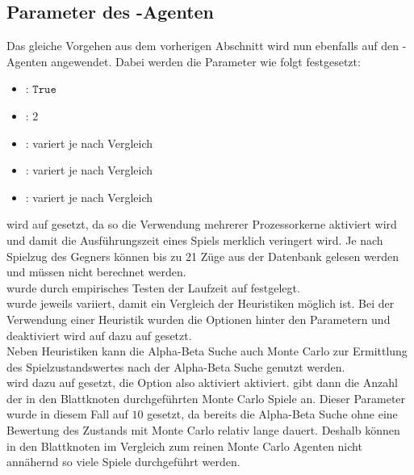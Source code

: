 \subsection{Parameter des -Agenten}
\label{eval:agents:params:subsec-ab}
Das gleiche Vorgehen aus dem vorherigen Abschnitt wird nun ebenfalls auf den -Agenten angewendet.
Dabei werden die Parameter wie folgt festgesetzt:
\begin{itemize}
\item {}: $\mathtt{True}$
\item {}: $2$
\item {}: variert je nach Vergleich
\item {}: variert je nach Vergleich
\item {}: variert je nach Vergleich
\end{itemize}
 wird auf  gesetzt, da so die Verwendung mehrerer Prozessorkerne aktiviert wird und damit die Ausführungszeit eines Spiels merklich veringert wird. Je nach Spielzug des Gegners können bis zu 21 Züge aus der Datenbank  gelesen werden und müssen nicht berechnet werden.
\\ wurde durch empirisches Testen der Laufzeit auf  festgelegt.
\\ wurde jeweils variiert, damit ein Vergleich der Heuristiken möglich ist. Bei der Verwendung einer Heuristik wurden die Optionen hinter den Parametern  und  deaktiviert  wird auf dazu auf  gesetzt. 
\vspace{0.5cm}
\\Neben Heuristiken kann die Alpha-Beta Suche auch Monte Carlo zur Ermittlung des Spielzustandswertes nach der Alpha-Beta Suche genutzt werden.
\\ wird dazu auf  gesetzt, die Option also aktiviert aktiviert.  gibt dann die Anzahl der in den Blattknoten durchgeführten Monte Carlo Spiele an. Dieser Parameter wurde in diesem Fall auf $10$ gesetzt, da bereits die Alpha-Beta Suche ohne eine Bewertung des Zustands mit Monte Carlo relativ lange dauert. Deshalb können in den Blattknoten im Vergleich zum reinen Monte Carlo Agenten nicht annähernd so viele Spiele durchgeführt werden. 

